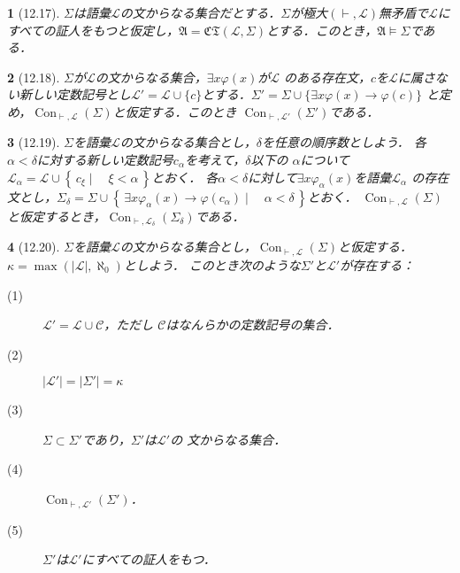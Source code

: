 \documentclass[a4j,10.5pt,oneside,openany]{jsbook}
\theoremstyle{mystyle}
\newtheorem{thm}{\color{DarkMidnightBlue}{定理}}[section]
\newcommand{\Set}[2]{\left\{\, #1 \mid \quad #2\, \right\}} %
\newcommand{\Con}{\operatorname{Con}} %
\begin{document}
	\begin{screen}
		\begin{thm}[12.17]
			$\Sigma$は語彙$\mathcal{L}$の文からなる集合だとする．$\Sigma$が極大$(\vdash,
			\mathcal{L})$無矛盾で$\mathcal{L}$にすべての証人をもつと仮定し，$\mathfrak{A}
			= \mathfrak{CT}(\mathcal{L},\Sigma)$とする．このとき，$\mathfrak{A} \models
			\Sigma$である．
		\end{thm}
	\end{screen}
	
	\begin{screen}
		\begin{thm}[12.18]
			$\Sigma$が$\mathcal{L}$の文からなる集合，$\exists x \varphi(x)$が$\mathcal{L}$
			のある存在文，$c$を$\mathcal{L}$に属さない新しい定数記号とし$\mathcal{L}'
			= \mathcal{L} \cup \{c\}$とする．$\Sigma' = \Sigma \cup \{\exists x \varphi(x) \rightarrow \varphi(c)\}$
			と定め，$\Con_{\vdash,\mathcal{L}}(\Sigma)$と仮定する．このとき
			$\Con_{\vdash,\mathcal{L}'}(\Sigma')$である．
		\end{thm}
	\end{screen}
	
	\begin{screen}
		\begin{thm}[12.19]
			$\Sigma$を語彙$\mathcal{L}$の文からなる集合とし，$\delta$を任意の順序数としよう．
			各$\alpha < \delta$に対する新しい定数記号$c_{\alpha}$を考えて，$\delta$以下の
			$\alpha$について$\mathcal{L}_{\alpha} = \mathcal{L} \cup \Set{c_{\xi}}{\xi < \alpha}$とおく．
			各$\alpha < \delta$に対して$\exists x \varphi_{\alpha}(x)$を語彙$\mathcal{L}_{\alpha}$
			の存在文とし，$\Sigma_{\delta} = \Sigma \cup \Set{\exists x \varphi_{\alpha}(x) \rightarrow \varphi(c_{\alpha})}{\alpha < \delta}$とおく．
			$\Con_{\vdash,\mathcal{L}}(\Sigma)$と仮定するとき，$\Con_{\vdash,\mathcal{L}_{\delta}}(\Sigma_{\delta})$である．
		\end{thm}
	\end{screen}
	
	\begin{screen}
		\begin{thm}[12.20]
			$\Sigma$を語彙$\mathcal{L}$の文からなる集合とし，$\Con_{\vdash,\mathcal{L}}
			(\Sigma)$と仮定する．$\kappa = \max{(|\mathcal{L}|,\aleph_{0})}$としよう．
			このとき次のような$\Sigma'$と$\mathcal{L}'$が存在する：
			\begin{description}
				\item[(1)] $\mathcal{L}' = \mathcal{L} \cup \mathcal{C}$，ただし
					$\mathcal{C}$はなんらかの定数記号の集合．
				\item[(2)] $|\mathcal{L}'| = |\Sigma'| = \kappa$
				\item[(3)] $\Sigma \subset \Sigma'$であり，$\Sigma'$は$\mathcal{L}'$の
					文からなる集合．
				\item[(4)] $\Con_{\vdash,\mathcal{L}'}(\Sigma')$．
				\item[(5)] $\Sigma'$は$\mathcal{L}'$にすべての証人をもつ．
			\end{description}
		\end{thm}
	\end{screen}
\end{document}
